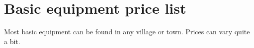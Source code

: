 
\pagebreak[1]
\section*{Basic equipment price list}

Most basic equipment can be found in any village or town. Prices can vary quite a bit.




